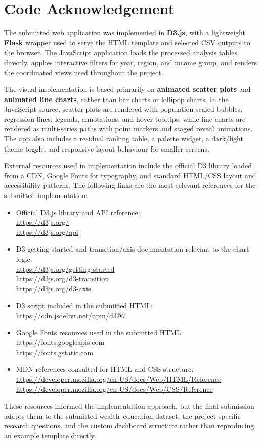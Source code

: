 \documentclass{vgtc}
\begin{document}
\FloatBarrier
\section{Code Acknowledgement}
\small
The submitted web application was implemented in \textbf{D3.js}, with a lightweight \textbf{Flask} wrapper used to serve the HTML template and selected CSV outputs to the browser. The JavaScript application loads the processed analysis tables directly, applies interactive filters for year, region, and income group, and renders the coordinated views used throughout the project.

The visual implementation is based primarily on \textbf{animated scatter plots} and \textbf{animated line charts}, rather than bar charts or lollipop charts. In the JavaScript source, scatter plots are rendered with population-scaled bubbles, regression lines, legends, annotations, and hover tooltips, while line charts are rendered as multi-series paths with point markers and staged reveal animations. The app also includes a residual ranking table, a palette widget, a dark/light theme toggle, and responsive layout behaviour for smaller screens.

External resources used in implementation include the official D3 library loaded from a CDN, Google Fonts for typography, and standard HTML/CSS layout and accessibility patterns. The following links are the most relevant references for the submitted implementation:

\begin{itemize}[leftmargin=*]
  \item Official D3.js library and API reference:\\
  \url{https://d3js.org/}\\
  \url{https://d3js.org/api}
  \item D3 getting started and transition/axis documentation relevant to the chart logic:\\
  \url{https://d3js.org/getting-started}\\
  \url{https://d3js.org/d3-transition}\\
  \url{https://d3js.org/d3-axis}
  \item D3 script included in the submitted HTML:\\
  \url{https://cdn.jsdelivr.net/npm/d3@7}
  \item Google Fonts resources used in the submitted HTML:\\
  \url{https://fonts.googleapis.com}\\
  \url{https://fonts.gstatic.com}
  \item MDN references consulted for HTML and CSS structure:\\
  \url{https://developer.mozilla.org/en-US/docs/Web/HTML/Reference}\\
  \url{https://developer.mozilla.org/en-US/docs/Web/CSS/Reference}
\end{itemize}

These resources informed the implementation approach, but the final submission adapts them to the submitted wealth--education dataset, the project-specific research questions, and the custom dashboard structure rather than reproducing an example template directly.
\end{document}
